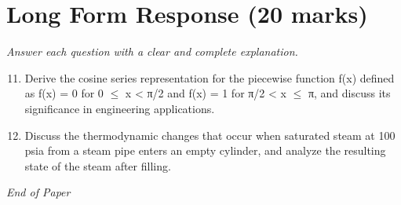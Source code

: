 \documentclass[12pt]{article}
\begin{document}
\section*{Long Form Response (20 marks)}
\textit{Answer each question with a clear and complete explanation.}
\begin{enumerate}[label=\arabic*.]
\setcounter{enumi}{10}
\item Derive the cosine series representation for the piecewise function f(x) defined as f(x) = 0 for 0 \ensuremath{\leq} x \textless{} π/2 and f(x) = 1 for π/2 \textless{} x \ensuremath{\leq} π, and discuss its significance in engineering applications.
\item Discuss the thermodynamic changes that occur when saturated steam at 100 psia from a steam pipe enters an empty cylinder, and analyze the resulting state of the steam after filling.
\end{enumerate}

\vfill
\noindent\textit{End of Paper}
\end{document}
